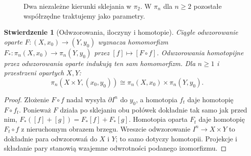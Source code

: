 \documentclass[11pt,a4paper,oneside]{report}
\theoremstyle{plain}
\newtheorem{stwierdzenie}[twierdzenie]{Stwierdzenie}
\theoremstyle{definition}
\theoremstyle{remark}
\begin{document}
\begin{figure}[!htbp]
\centering
{}
\caption{Dwa niezależne kierunki sklejania w $\pi_2$.
W $\pi_n$ dla $n\geq2$ pozostałe współrzędne
traktujemy jako parametry.}
\label{fig:pi2-sklejanie}
\end{figure}

\begin{stwierdzenie}[Odwzorowania, iloczyny i homotopie]
\label{prop:pi-n-funktor}
Ciągłe odwzorowanie oparte $F:(X,x_0)\to(Y,y_0)$ wyznacza
homomorfizm $F_*:\pi_n(X,x_0)\to\pi_n(Y,y_0)$
przez $[f]\mapsto[F\circ f]$.
Odwzorowania homotopijne \emph{przez odwzorowania oparte}
indukują ten sam homomorfizm. Dla
$n\geq1$ i przestrzeni opartych $X,Y$:
\[
 \pi_n(X\times Y,(x_0,y_0))
 \cong \pi_n(X,x_0)\times\pi_n(Y,y_0).
\]
\end{stwierdzenie}
\begin{proof}
Złożenie $F\circ f$ nadal wysyła
$\partial I^n$ do $y_0$, a homotopia
$f_t$ daje homotopię $F\circ f_t$.
Ponieważ $F$ działa po sklejaniu
obu połówek dokładnie tak samo
jak przed nim, $F_*([f]+[g])
=F_*[f]+F_*[g]$. Homotopia
oparta $F_t$ daje homotopię
$F_t\circ f$ z nieruchomym
obrazem brzegu. Wreszcie odwzorowanie
$I^n\to X\times Y$ to dokładnie
para odwzorowań do $X$ i $Y$; to
samo dotyczy homotopii.
Projekcje i składanie pary
stanowią wzajemne odwrotności
podanego izomorfizmu.
\end{proof}
\end{document}
